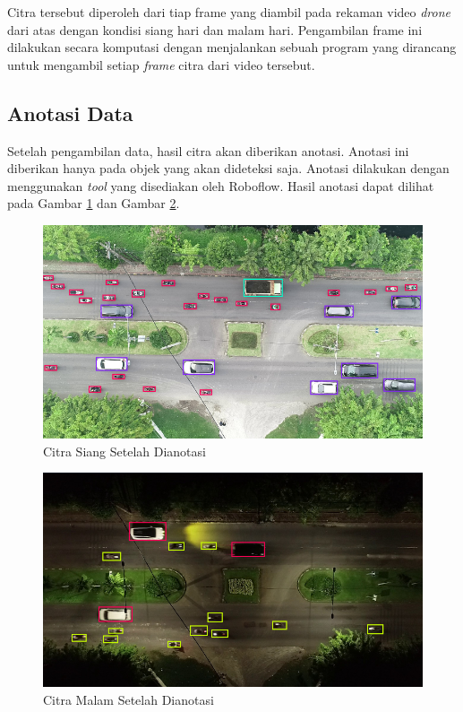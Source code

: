 Citra tersebut diperoleh dari tiap frame yang diambil pada rekaman video \emph{drone} dari atas dengan kondisi siang hari dan malam hari. Pengambilan frame ini dilakukan secara komputasi dengan menjalankan sebuah program yang dirancang untuk mengambil setiap \emph{frame} citra dari video tersebut.

\subsection{Anotasi Data}
Setelah pengambilan data, hasil citra akan diberikan anotasi. Anotasi ini diberikan hanya pada objek yang akan dideteksi saja. Anotasi dilakukan dengan menggunakan \emph{tool} yang disediakan oleh Roboflow. Hasil anotasi dapat dilihat pada Gambar \ref{fig:anotasidatasiang} dan Gambar \ref{fig:anotasidatamalam}.

\begin{figure} [H] \centering
  \includegraphics[scale=0.5]{bab3/anotasidatasiang.png}
  \caption{Citra Siang Setelah Dianotasi}
  \label{fig:anotasidatasiang}
\end{figure}

\begin{figure} [H] \centering
  \includegraphics[scale=0.5]{bab3/anotasidatamalam.png}
  \caption{Citra Malam Setelah Dianotasi}
  \label{fig:anotasidatamalam}
\end{figure}

